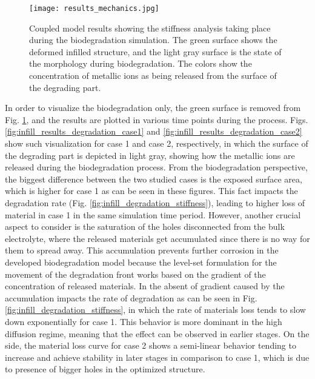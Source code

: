 \begin{figure}[h]
\centering
\medskip
\texttt{[image: results\_mechanics.jpg]}
\caption[Coupled model results showing the stiffness analysis taking place during biodegradation simulation]{Coupled model results showing the stiffness analysis taking place during the biodegradation simulation. The green surface shows the deformed infilled structure, and the light gray surface is the state of the morphology during biodegradation. The colors show the concentration of metallic ions as being released from the surface of the degrading part.} \label{fig:infill_results_mechanics}
\end{figure}

In order to visualize the biodegradation only, the green surface is removed from Fig. \ref{fig:infill_results_mechanics}, and the results are plotted in various time points during the process. Figs. \ref{fig:infill_results_degradation_case1} and \ref{fig:infill_results_degradation_case2} show such visualization for case 1 and case 2, respectively, in which the surface of the degrading part is depicted in light gray, showing how the metallic ions are released during the biodegradation process. From the biodegradation perspective, the biggest difference between the two studied cases is the exposed surface area, which is higher for case 1 as can be seen in these figures. This fact impacts the degradation rate (Fig. \ref{fig:infill_degradation_stiffness}), leading to higher loss of material in case 1 in the same simulation time period. However, another crucial aspect to consider is the saturation of the holes disconnected from the bulk electrolyte, where the released materials get accumulated since there is no way for them to spread away. This accumulation prevents further corrosion in the developed biodegradation model because the level-set formulation for the movement of the degradation front works based on the gradient of the concentration of released materials. In the absent of gradient caused by the accumulation impacts the rate of degradation as can be seen in Fig. \ref{fig:infill_degradation_stiffness}, in which the rate of materials loss tends to slow down exponentially for case 1. This behavior is more dominant in the high diffusion regime, meaning that the effect can be observed in earlier stages. On the side, the material loss curve for case 2 shows a semi-linear behavior tending to increase and achieve stability in later stages in comparison to case 1, which is due to presence of bigger holes in the optimized structure. 

